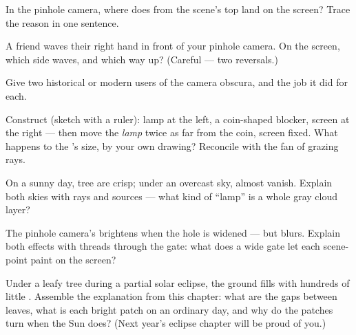 \begin{exercise}[$\star$]\label{exo:g6:light-propagation:6}
In the pinhole camera, where does  from the scene's top land
on the screen? Trace the reason in one sentence.
\end{exercise}

\begin{exercise}[$\star$]\label{exo:g6:light-propagation:7}
A friend waves their right hand in front of your pinhole camera.
On the screen, which side waves, and which way up? (Careful ---
two reversals.)
\end{exercise}

\begin{exercise}[$\star$]\label{exo:g6:light-propagation:8}
Give two historical or modern users of the camera obscura, and the
job it did for each.
\end{exercise}

\begin{exercise}[$\star\star$]\label{exo:g6:light-propagation:9}
Construct (sketch with a ruler): lamp at the left, a coin-shaped
blocker, screen at the right --- then move the \emph{lamp} twice
as far from the coin, screen fixed. What happens to the 's
size, by your own drawing? Reconcile with the fan of grazing
rays.
\end{exercise}

\begin{exercise}[$\star\star$]\label{exo:g6:light-propagation:10}
On a sunny day, tree  are crisp; under an overcast sky,
 almost vanish. Explain both skies with rays and sources
--- what kind of ``lamp'' is a whole gray cloud layer?
\end{exercise}

\begin{exercise}[$\star\star$]\label{exo:g6:light-propagation:11}
The pinhole camera's  brightens when the hole is widened ---
but blurs. Explain both effects with threads through the gate:
what does a wide gate let each scene-point paint on the screen?
\end{exercise}

\begin{exercise}[$\star\star\star$]\label{exo:g6:light-propagation:12}
Under a leafy tree during a partial solar eclipse, the ground
fills with hundreds of little . Assemble the explanation
from this chapter: what are the gaps between leaves, what is each
bright patch on an ordinary day, and why do the patches turn
 when the Sun does? (Next year's eclipse chapter will be
proud of you.)
\end{exercise}

